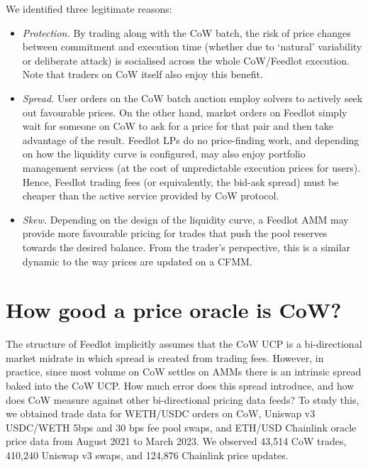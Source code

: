 \documentclass[a4paper,10pt]{article}
\theoremstyle{remark}
\begin{document}
We identified three legitimate reasons:
\begin{itemize}
  \item 
    \emph{Protection.} By trading along with the CoW batch, the risk of price changes between commitment and execution time (whether due to `natural' variability or deliberate attack) is socialised across the whole CoW/Feedlot execution.
    Note that traders on CoW itself also enjoy this benefit.
    
  \item
    \emph{Spread.} User orders on the CoW batch auction employ solvers to actively seek out favourable prices. On the other hand, market orders on Feedlot simply wait for someone on CoW to ask for a price for that pair and then take advantage of the result.
    Feedlot LPs do no price-finding work, and depending on how the liquidity curve is configured, may also enjoy portfolio management services (at the cost of unpredictable execution prices for users).
    Hence, Feedlot trading fees (or equivalently, the bid-ask spread) must be cheaper than the active service provided by CoW protocol.
    
  \item
    \emph{Skew.} Depending on the design of the liquidity curve, a Feedlot AMM may provide more favourable pricing for trades that push the pool reserves towards the desired balance.
    From the trader's perspective, this is a similar dynamic to the way prices are updated on a CFMM.

\end{itemize}

\section{How good a price oracle is CoW?}
\label{price-analysis}

The structure of Feedlot implicitly assumes that the CoW UCP is a bi-directional market midrate in which spread is created from trading fees.
%
However, in practice, since most volume on CoW settles on AMMs there is an intrinsic spread baked into the CoW UCP.
%
How much error does this spread introduce, and how does CoW measure against other bi-directional pricing data feeds?
%
To study this, we obtained trade data for WETH/USDC orders on CoW, Uniswap v3 USDC/WETH 5bps and 30 bps fee pool swaps, and ETH/USD Chainlink oracle price data from August 2021 to March 2023. 
%
We observed 43,514 CoW trades, 410,240 Uniswap v3 swaps, and 124,876 Chainlink price updates. 
\end{document}
